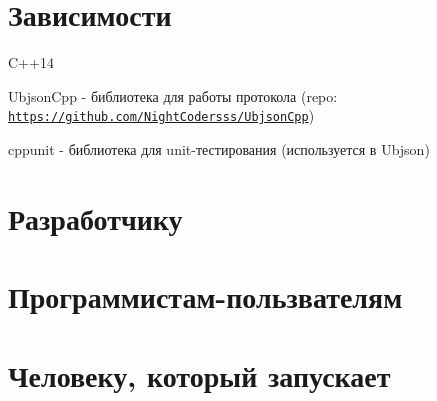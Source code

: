 \section*{Зависимости }


\begin{DoxyItemize}
\item C++14
\item Ubjson\-Cpp -\/ библиотека для работы протокола (repo\-: \href{https://github.com/NightCodersss/UbjsonCpp}{\tt https\-://github.\-com/\-Night\-Codersss/\-Ubjson\-Cpp})
\item cppunit -\/ библиотека для unit-\/тестирования (используется в Ubjson)
\end{DoxyItemize}

\section*{Разработчику }

\section*{Программистам-\/пользвателям }

\section*{Человеку, который запускает }